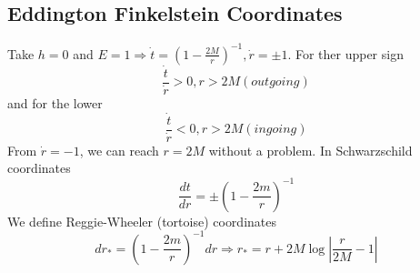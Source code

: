 \documentclass{article}
\begin{document}
\subsection{Eddington Finkelstein Coordinates}
Take $h=0$ and $E=1 \Rightarrow \dot{t} = (1-\frac{2M}{r})^{-1}, \dot{r} = \pm1$. For ther upper sign 
\[
\frac{\dot{t}}{\dot{r}} > 0, r>2M (outgoing)
\]
and for the lower 
\[
\frac{\dot{t}}{\dot{r}} < 0, r>2M (ingoing)
\]
From $\dot{r}=-1$, we can reach $r=2M$ without a problem. In Schwarzschild coordinates 
\[
\frac{dt}{dr} = \pm (1-\frac{2m}{r} )^{-1}
\]
We define Reggie-Wheeler (tortoise) coordinates
\[
dr_\ast = (1-\frac{2m}{r} )^{-1} dr \Rightarrow r_\ast = r+2M\log \left\lvert \frac{r}{2M} -1 \right\rvert
\]
\end{document}

